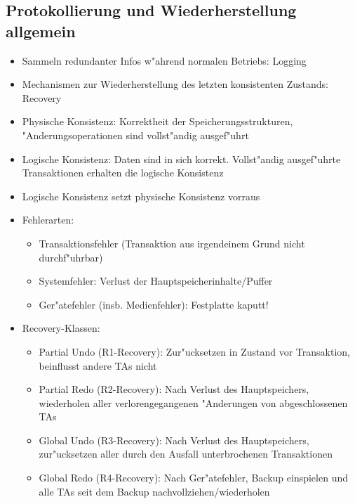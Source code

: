 \documentclass[a4paper, 12pt]{scrartcl}
\begin{document}
\subsection{Protokollierung und Wiederherstellung allgemein}
\begin{itemize}
	\item
		Sammeln redundanter Infos w"ahrend normalen Betriebs: Logging
	\item
		Mechanismen zur Wiederherstellung des letzten konsistenten Zustands: Recovery
	\item
		Physische Konsistenz: Korrektheit der Speicherungsstrukturen, "Anderungsoperationen sind vollst"andig ausgef"uhrt
	\item
		Logische Konsistenz: Daten sind in sich korrekt. Vollst"andig ausgef"uhrte Transaktionen erhalten die logische Konsistenz
	\item
		Logische Konsistenz setzt physische Konsistenz vorraus
	\item
		Fehlerarten:
		\begin{itemize}
			\item
				Transaktionsfehler (Transaktion aus irgendeinem Grund nicht durchf"uhrbar)
			\item
				Systemfehler: Verlust der Hauptspeicherinhalte/Puffer
			\item
				Ger"atefehler (insb. Medienfehler): Festplatte kaputt!
		\end{itemize}

	\item
		Recovery-Klassen:
		\begin{itemize}
			\item
				Partial Undo (R1-Recovery): Zur"ucksetzen in Zustand vor Transaktion, beinflusst andere TAs nicht
			\item
				Partial Redo (R2-Recovery): Nach Verlust des Hauptspeichers, wiederholen aller verlorengegangenen "Anderungen von abgeschlossenen TAs
			\item
				Global Undo (R3-Recovery): Nach Verlust des Hauptspeichers, zur"ucksetzen aller durch den Ausfall unterbrochenen Transaktionen
			\item
				Global Redo (R4-Recovery): Nach Ger"atefehler, Backup einspielen und alle TAs seit dem Backup nachvollziehen/wiederholen
		\end{itemize}
\end{itemize}
\end{document}
